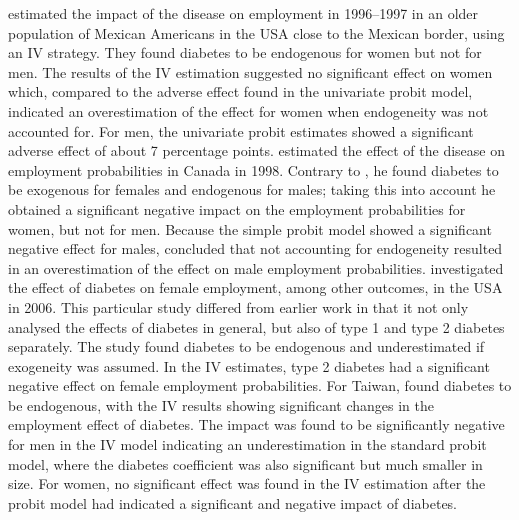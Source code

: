 \textcite{Brown2005} estimated the impact of the disease on
employment in 1996--1997 in an older population of Mexican Americans
in the USA close to the Mexican border, using an \ac{IV} strategy. They found diabetes to be endogenous for women but not
for men. The results of the \ac{IV} estimation suggested no significant
effect on women which, compared to the adverse effect found in the
univariate probit model, indicated an overestimation of the effect for women
when endogeneity was not accounted for. For men, the univariate probit estimates
showed a significant adverse effect of about 7 percentage points.
\textcite{Latif2009} estimated the effect of the disease on employment
probabilities in Canada in 1998. Contrary to \textcite{Brown2005}, he
found diabetes to be exogenous for females and endogenous for males;
taking this into account he obtained a significant negative impact
on the employment probabilities for women, but not for men. Because
the simple probit model showed a significant negative effect for males,
\textcite{Latif2009} concluded that not accounting for endogeneity resulted
in an overestimation of the effect on male employment probabilities. \textcite{Minor2011}
investigated the effect of diabetes on female employment, among other
outcomes, in the USA in 2006. This particular study differed
from earlier work in that it not only analysed the effects of diabetes
in general, but also of type 1 and type 2 diabetes separately. The
study found diabetes to be endogenous and underestimated if exogeneity
was assumed. In the \ac{IV} estimates, type 2 diabetes had a significant
negative effect on female employment probabilities. For Taiwan, \textcite{Lin2011b}
found diabetes to be endogenous, with the \ac{IV} results showing
significant changes in the employment effect of diabetes. The impact
was found to be significantly negative for men in the \ac{IV} model
indicating an underestimation in the standard probit model, where
the diabetes coefficient was also significant but much smaller in
size. For women, no significant effect was found in the \ac{IV} estimation
after the probit model had indicated a significant and negative impact
of diabetes. 

